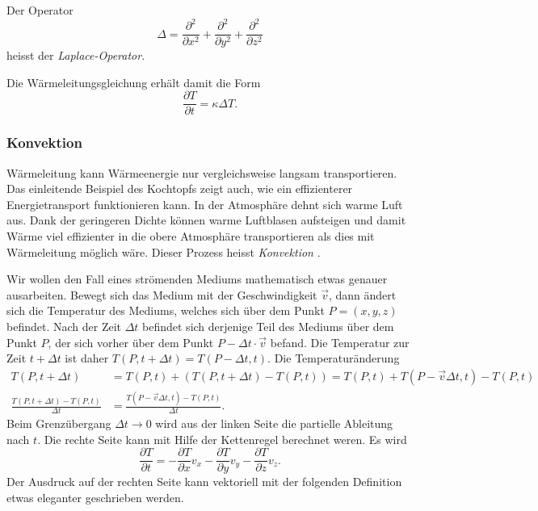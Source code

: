 \begin{definition}
Der Operator
\[
\Delta
=
\frac{\partial^2}{\partial x^2}
+
\frac{\partial^2}{\partial y^2}
+
\frac{\partial^2}{\partial z^2}
\]
heisst der
{\em Laplace-Operator}.
\end{definition}

Die Wärmeleitungsgleichung erhält damit die Form
\begin{equation}
\frac{\partial T}{\partial t}
=
\kappa\Delta T.
\label{skript:waermeleitung2}
\end{equation}

\subsubsection{Konvektion}
Wärmeleitung kann Wärmeenergie nur vergleichsweise langsam transportieren.
Das einleitende Beispiel des Kochtopfs zeigt auch, wie ein effizienterer
Energietransport funktionieren kann.
In der Atmosphäre dehnt sich warme Luft aus.
Dank der geringeren Dichte können warme Luftblasen aufsteigen und damit
Wärme viel effizienter in die obere Atmosphäre transportieren
als dies mit Wärmeleitung möglich wäre.
Dieser Prozess heisst {\em Konvektion} \cite{skript:konvektion}.
%

Wir wollen den Fall eines strömenden Mediums mathematisch etwas genauer
ausarbeiten.
Bewegt sich das Medium mit der Geschwindigkeit $\vec v$, dann ändert sich
die Temperatur des Mediums, welches sich über dem Punkt $P=(x,y,z)$
befindet.
Nach der Zeit $\Delta t$ befindet sich derjenige Teil des Mediums
über dem Punkt $P$, der sich vorher über dem Punkt $P-\Delta t\cdot\vec v$
befand.
Die Temperatur zur Zeit $t+\Delta t$ ist daher
$T(P,t+\Delta t)=T(P-\Delta t,t)$.
Die Temperaturänderung
\begin{align*}
T(P,t+\Delta t)
&=
T(P,t) + (T(P,t+\Delta t)-T(P,t))
=
T(P,t) + T(P-\vec v\Delta t, t)-T(P,t)
\\
\frac{
T(P,t+\Delta t)
-
T(P,t)
}{\Delta t}
&=
\frac{
T(P-\vec v\Delta t, t)-T(P,t)
}{\Delta t}.
\end{align*}
Beim Grenzübergang $\Delta t\to 0$ wird aus der linken Seite die
partielle Ableitung nach $t$.
Die rechte Seite kann mit Hilfe der Kettenregel berechnet weren.
Es wird
\begin{equation}
\frac{\partial T}{\partial t}
=
-
\frac{\partial T}{\partial x} v_x
-
\frac{\partial T}{\partial y} v_y
-
\frac{\partial T}{\partial z} v_z.
\label{skript:advektion1}
\end{equation}
Der Ausdruck auf der rechten Seite kann vektoriell mit der folgenden
Definition etwas eleganter geschrieben werden.


